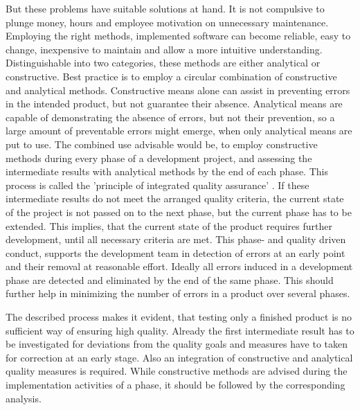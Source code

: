 \documentclass[master,english,smartquotes,apa]{hgbthesis}
\begin{document}
But these problems have suitable solutions at hand. It is not compulsive to plunge money, hours and employee motivation on unnecessary maintenance. Employing the right methods, implemented software can become reliable, easy to change, inexpensive to maintain and allow a more intuitive understanding. Distinguishable into two categories, these methods are either analytical or constructive.
Best practice is to employ a circular combination of constructive and analytical methods. Constructive means alone can assist in preventing errors in the intended product, but not guarantee their absence. Analytical means are capable of demonstrating the absence of errors, but not their prevention, so a large amount of preventable errors might emerge, when only analytical means are put to use. The combined use advisable would be, to employ constructive methods during every phase of a development project, and assessing the intermediate results with analytical methods by the end of each phase. This process is called the 'principle of integrated quality assurance' \cite{Liggesmeyer2002}. If these intermediate results do not meet the arranged quality criteria, the current state of the project is not passed on to the next phase, but the current phase has to be extended. This implies, that the current state of the product requires further development, until all necessary criteria are met. This phase- and quality driven conduct, supports the development team in detection of errors at an early point and their removal at reasonable effort. Ideally all errors induced in a development phase are detected and eliminated by the end of the same phase. This should further help in minimizing the number of errors in a product over several phases. 

The described process makes it evident, that testing only a finished product is no sufficient way of ensuring high quality. Already the first intermediate result has to be investigated for deviations from the quality goals and measures have to taken for correction at an early stage. Also an integration of constructive and analytical quality measures is required. While constructive methods are advised during the implementation activities of a phase, it should be followed by the corresponding analysis.
\end{document}
